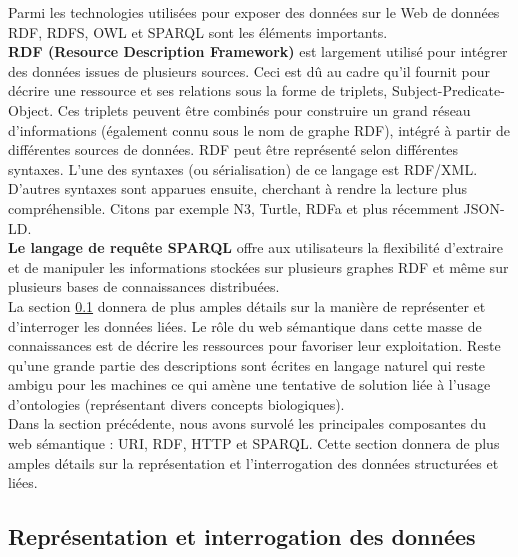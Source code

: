 
Parmi les technologies utilisées pour exposer des données sur le Web de données RDF, RDFS, OWL et SPARQL sont les éléments importants.\\

\textbf{RDF (Resource Description Framework)} est largement utilisé pour intégrer des données issues de plusieurs sources. Ceci est dû au cadre qu'il fournit pour décrire une ressource et ses relations sous la forme de triplets, Subject-Predicate-Object. Ces triplets peuvent être combinés pour construire un grand réseau d'informations (également connu sous le nom de graphe RDF), intégré à partir de différentes sources de données.  RDF peut être représenté selon différentes syntaxes. L'une des syntaxes (ou sérialisation) de ce langage est RDF/XML. D'autres syntaxes sont apparues ensuite, cherchant à rendre la lecture plus compréhensible. Citons par exemple N3, Turtle, RDFa et plus récemment JSON-LD.\\ 
 
\textbf{Le langage de requête SPARQL} offre aux utilisateurs la flexibilité d'extraire et de manipuler les informations stockées sur plusieurs graphes RDF et même sur plusieurs bases de connaissances distribuées. \\ 

La section \ref{interrogation} donnera de plus amples détails sur la manière de représenter et d’interroger les données liées.
Le rôle du web sémantique dans cette masse de connaissances est de décrire les ressources pour favoriser leur exploitation. Reste qu'une grande partie des descriptions sont écrites en langage naturel qui reste ambigu pour les machines ce qui amène une tentative de solution liée à l'usage d'ontologies (représentant divers concepts biologiques). \\

Dans la section précédente, nous avons survolé les principales composantes du web sémantique : URI, RDF, HTTP et SPARQL. Cette section donnera de plus amples détails sur la représentation et l’interrogation des données structurées et liées.

\subsection{Représentation et interrogation des données}\label{interrogation}

